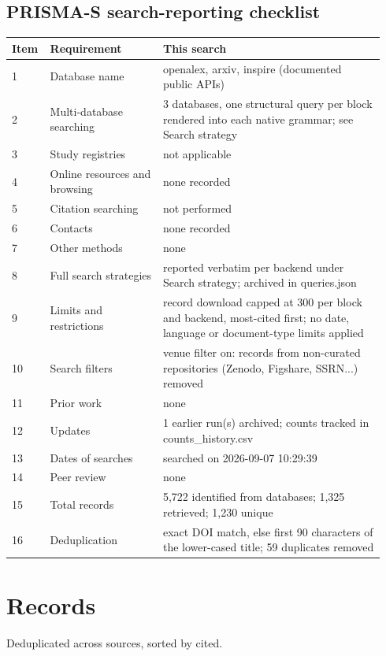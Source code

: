 \documentclass[10pt,a4paper]{article}
\begin{document}
\subsection*{PRISMA-S search-reporting checklist}
{\scriptsize\begin{longtable}{p{0.072\linewidth}p{0.296\linewidth}p{0.574\linewidth}}
\hline
\textbf{Item} & \textbf{Requirement} & \textbf{This search} \\ \hline
\endhead
1 & Database name & openalex, arxiv, inspire (documented public APIs) \\
2 & Multi-database searching & 3 databases, one structural query per block rendered into each native grammar; see Search strategy \\
3 & Study registries & not applicable \\
4 & Online resources and browsing & none recorded \\
5 & Citation searching & not performed \\
6 & Contacts & none recorded \\
7 & Other methods & none \\
8 & Full search strategies & reported verbatim per backend under Search strategy; archived in queries.json \\
9 & Limits and restrictions & record download capped at 300 per block and backend, most-cited first; no date, language or document-type limits applied \\
10 & Search filters & venue filter on: records from non-curated repositories (Zenodo, Figshare, SSRN...) removed \\
11 & Prior work & none \\
12 & Updates & 1 earlier run(s) archived; counts tracked in counts\_history.csv \\
13 & Dates of searches & searched on 2026-09-07 10:29:39 \\
14 & Peer review & none \\
15 & Total records & 5,722 identified from databases; 1,325 retrieved; 1,230 unique \\
16 & Deduplication & exact DOI match, else first 90 characters of the lower-cased title; 59 duplicates removed \\
\hline
\end{longtable}}
\section*{Records}
Deduplicated across sources, sorted by cited.
\end{document}
